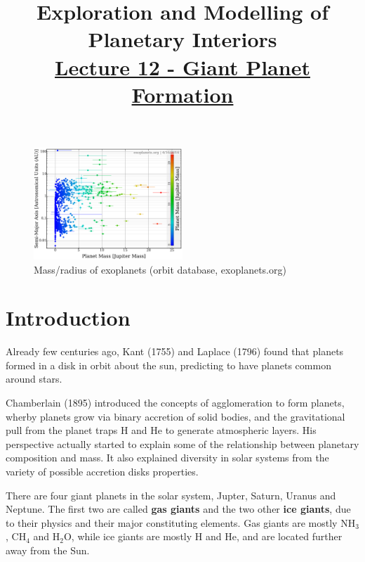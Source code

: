 \documentclass[12pt]{article} %
\title{\large{\vspace{-5ex}\textbf{Exploration and Modelling of Planetary Interiors}}\newline\\{\textbf{\underline{Lecture 12 - Giant Planet Formation}}}\vspace{-7ex}}
\author{}
\date{} %
\begin{document}
\begingroup
\let\center\flushleft
\let\endcenter\endflushleft
\maketitle
\endgroup

\begingroup
\let\cleardoublepage\relax
\let\clearpage\relax
\tableofcontents
\endgroup

\begin{figure}
\begin{center}
 \includegraphics[width=0.5\textwidth,keepaspectratio=true]{./images/exoplanets}
 \caption{Mass/radius of exoplanets (orbit database, exoplanets.org)}
 \label{exoplanets}
\end{center}
\end{figure}


\section{Introduction}\vspace{-2ex}\titlerule[1pt]\bigskip

\noindent Already few centuries ago, Kant (1755) and Laplace (1796) found that planets formed in a disk in orbit about the sun, predicting to have planets common around stars. \newline

\noindent Chamberlain (1895) introduced the concepts of agglomeration to form planets, wherby planets grow via binary accretion of solid bodies, and the gravitational pull from the planet traps H and He to generate atmospheric layers. His perspective actually started to explain some of the relationship between planetary composition and mass. It also explained diversity in solar systems from the variety of possible accretion disks properties. \newline

\noindent There are four giant planets in the solar system, Jupter, Saturn, Uranus and Neptune. The first two are called \textbf{gas giants} and the two other \textbf{ice giants}, due to their physics and their major constituting elements. Gas giants are mostly NH$_3$, CH$_4$ and H$_2$O, while ice giants are mostly H and He, and are located further away from the Sun.
\end{document}
